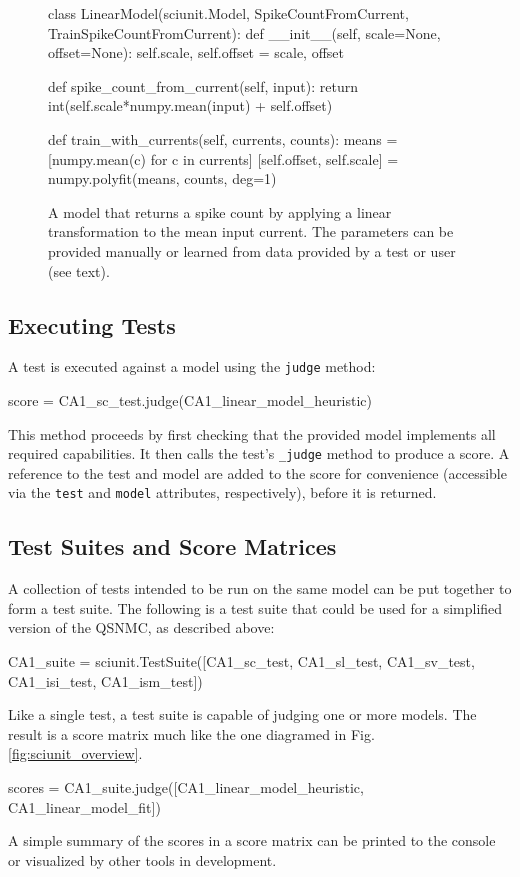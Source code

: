 \documentclass{frontiersSCNS}
\let\verbx\lstinline
\begin{document}
\begin{figure}
\begin{python}
class LinearModel(sciunit.Model, SpikeCountFromCurrent, 
    TrainSpikeCountFromCurrent):
  def __init__(self, scale=None, offset=None): 
    self.scale, self.offset = scale, offset
    
  def spike_count_from_current(self, input):
    return int(self.scale*numpy.mean(input) + self.offset)

  def train_with_currents(self, currents, counts):
    means = [numpy.mean(c) for c in currents]
    [self.offset, self.scale] = numpy.polyfit(means, counts, deg=1)    
\end{python}
\vspace{-15px}
\caption{A model that returns a spike count by applying a linear transformation to the mean input current. The parameters can be provided manually or learned from data provided by a test or user (see text).}
\label{fig:simple_model}
\vspace{-10px}
\end{figure}

\subsection{Executing Tests} A test is executed against a model using the \verbx{judge} method:
\begin{python}
score = CA1_sc_test.judge(CA1_linear_model_heuristic)
\end{python}

This method proceeds by first checking that the provided model implements all required capabilities. It then calls the test's \verbx{_judge} method to produce a score.  A reference to the test and model are added to the score for convenience (accessible via the \verbx{test} and \verbx{model} attributes, respectively), before it is returned.

\subsection{Test Suites and Score Matrices} A collection of tests intended to be run on the same model can be put together to form a test suite.
The following is a test suite that could be used for a simplified version of the QSNMC, as described above:  
\begin{python}
CA1_suite = sciunit.TestSuite([CA1_sc_test, CA1_sl_test, CA1_sv_test, CA1_isi_test, CA1_ism_test])
\end{python}
Like a single test, a test suite is capable of judging one or more models. The result is a score matrix much like the one diagramed in Fig. \ref{fig:sciunit_overview}.
\begin{python}
scores = CA1_suite.judge([CA1_linear_model_heuristic, CA1_linear_model_fit])
\end{python}
A simple summary of the scores in a score matrix can be printed to the console or visualized by other tools in development.
\end{document}
